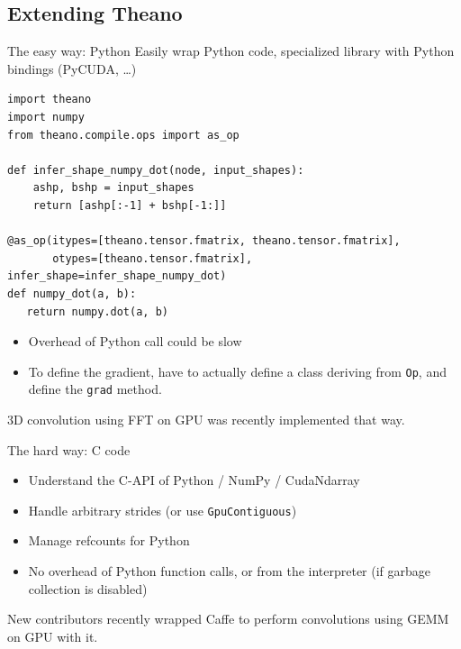 \documentclass[a4paper,9pt]{beamer}
\begin{document}
\subsection{Extending Theano}

\begin{frame}[fragile]{The easy way: Python}
\small
  Easily wrap Python code, specialized library with Python bindings (PyCUDA, \ldots)

  \begin{verbatim}
import theano
import numpy
from theano.compile.ops import as_op

def infer_shape_numpy_dot(node, input_shapes):
    ashp, bshp = input_shapes
    return [ashp[:-1] + bshp[-1:]]

@as_op(itypes=[theano.tensor.fmatrix, theano.tensor.fmatrix],
       otypes=[theano.tensor.fmatrix], infer_shape=infer_shape_numpy_dot)
def numpy_dot(a, b):
   return numpy.dot(a, b)

  \end{verbatim}
  \begin{itemize}
    \item Overhead of Python call could be slow
    \item To define the gradient, have to actually define a class deriving from \verb|Op|,
      and define the \verb|grad| method.
  \end{itemize}
  3D convolution using FFT on GPU was recently implemented that way.
\end{frame}

\begin{frame}[fragile]{The hard way: C code}
  \begin{itemize}
    \item Understand the C-API of Python / NumPy / CudaNdarray
    \item Handle arbitrary strides (or use \verb|GpuContiguous|)
    \item Manage refcounts for Python
    \item No overhead of Python function calls, or from the interpreter (if garbage
      collection is disabled)
  \end{itemize}
  New contributors recently wrapped Caffe to perform convolutions using GEMM on GPU with it.
\end{frame}
\end{document}

